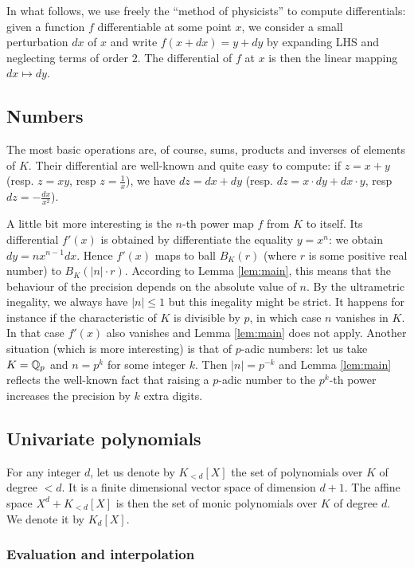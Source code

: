 \documentclass{lms}
\begin{document}
In what follows, we use freely the ``method of physicists'' to compute 
differentials: given a function $f$ differentiable at some point $x$, we 
consider a small perturbation $dx$ of $x$ and write $f(x+dx) = y + dy$ 
by expanding LHS and neglecting terms of order $2$. The differential of 
$f$ at $x$ is then the linear mapping $dx \mapsto dy$.

\subsection{Numbers}

The most basic operations are, of course, sums, products and inverses of 
elements of $K$. Their differential are well-known and quite easy to 
compute: if $z = x + y$ (resp. $z = xy$, resp $z = \frac 1 x$), we have 
$dz = dx + dy$ (resp. $dz = x \cdot dy + dx \cdot y$, resp $dz = - 
\frac{dx}{x^2}$).

A little bit more interesting is the $n$-th power map $f$ from $K$ to 
itself. Its differential $f'(x)$ is obtained by differentiate the 
equality $y = x^n$: we obtain $dy = n x^{n-1} dx$.
Hence $f'(x)$ maps to ball $B_K(r)$ (where $r$ is some positive real 
number) to $B_K(|n|{\cdot} r)$. According to Lemma \ref{lem:main}, this 
means that the behaviour of the precision depends on the absolute value 
of $n$. By the ultrametric inegality, we always have $|n| \leq 1$ but 
this inegality might be strict. It happens for instance if the 
characteristic of $K$ is divisible by $p$, in which case $n$ vanishes in 
$K$. In that case $f'(x)$ also vanishes and Lemma \ref{lem:main} does 
not apply. 
Another situation (which is more interesting) is that of $p$-adic 
numbers: let us take $K = \mathbb Q_p$ and $n = p^k$ for some integer $k$. Then
$|n| = p^{-k}$ and Lemma \ref{lem:main} reflects the well-known fact that
raising a $p$-adic number to the $p^k$-th power increases the precision 
by $k$ extra digits.

\subsection{Univariate polynomials}
\label{ssec:polynomials}

For any integer $d$, let us denote by $K_{< d}[X]$ the set of 
polynomials over $K$ of degree $< d$. It is a finite dimensional vector 
space of dimension $d+1$. The affine space $X^d + K_{< d}[X]$ is then 
the set of monic polynomials over $K$ of degree $d$. We denote it by 
$K_d[X]$.

\subsubsection*{Evaluation and interpolation}
\end{document}

